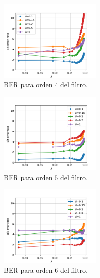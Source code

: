 \documentclass[main.tex]{subfiles}
\begin{document}
\begin{figure}[hp]
	\centering
	\includegraphics[width=0.45\textwidth]{imagenes/rls_ber_n4.png}
	\caption{BER para orden 4 del filtro.}
\end{figure}
\begin{figure}[hp]
	\centering
	\includegraphics[width=0.45\textwidth]{imagenes/rls_ber_n5.png}
	\caption{BER para orden 5 del filtro.}
\end{figure}
\begin{figure}[hp]
	\centering
	\includegraphics[width=0.45\textwidth]{imagenes/rls_ber_n6.png}
	\caption{BER para orden 6 del filtro.}
\end{figure}
\end{document}
